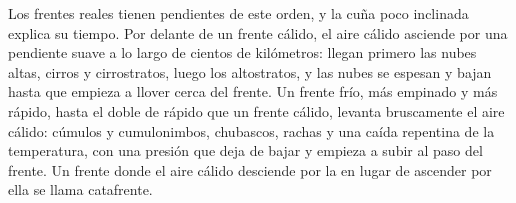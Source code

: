 Los frentes reales tienen pendientes de este orden, y la cuña poco inclinada explica su tiempo. Por delante de un
frente cálido, el aire cálido asciende por una pendiente suave a lo largo de cientos de kilómetros: llegan primero las nubes altas,
cirros y cirrostratos, luego los altostratos, y las nubes se espesan y bajan hasta que
empieza a llover cerca del frente. Un frente frío, más empinado y más rápido, hasta el doble de rápido que un frente
cálido, levanta bruscamente el aire cálido: cúmulos y cumulonimbos, chubascos, rachas y una caída repentina
de la temperatura, con una presión que deja de bajar y empieza a subir al paso del frente. Un frente
donde el aire cálido desciende por la  en lugar de ascender por ella se llama catafrente.

